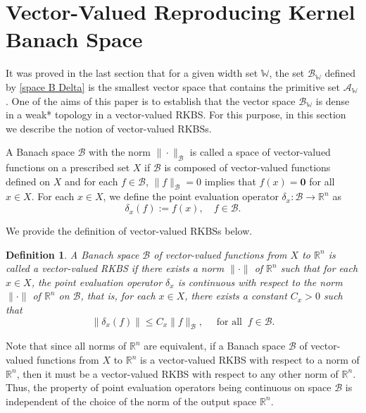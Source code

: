 \documentclass[11pt]{article}
\newtheorem{definition}[theorem]{Definition}
\begin{document}
%

%



\section{Vector-Valued Reproducing Kernel Banach Space}
It was proved in the last section that for a given width set $\mathbb{W}$, the set $\mathcal{B}_{\mathbb{W}}$ defined by \eqref{space B Delta} is the smallest vector space that contains the primitive set $\mathcal{A}_\mathbb{W}$. One of the aims of this paper is to establish that the vector space $\mathcal{B}_{\mathbb{W}}$ is dense in a weak* topology in a vector-valued RKBS. For this purpose, in this section we describe the notion of vector-valued RKBSs. 

A Banach space $\mathcal{B}$ with the norm $\|\cdot\|_{\mathcal{B}}$ is called a space of vector-valued functions on a prescribed set $X$ if $\mathcal{B}$ is composed of vector-valued functions defined on $X$ and for each $f\in\mathcal{B}$, $\|f\|_{\mathcal{B}}=0$ implies that $f({x}) = \mathbf{0}$ for all ${x}\in X$. 
For each ${x}\in X$, we define the point evaluation operator $\delta_{{x}}:\mathcal{B}\to\mathbb{R}^n$ as 
\begin{equation*}
    \delta_{{x}}(f):=f({x}), \quad f\in\mathcal{B}. 
\end{equation*}

We provide the definition of vector-valued RKBSs below.

\begin{definition}\label{def: vector-valued RKBS} 
A Banach space $\mathcal{B}$ of vector-valued functions from $X$ to $\mathbb{R}^n$ is called a vector-valued RKBS if there exists a norm $\|\cdot\|$ of $\mathbb{R}^n$ such that for each $x\in X$, the point evaluation operator $\delta_x$ is continuous with respect to the norm $\|\cdot\|$ of $\mathbb{R}^n$ on $\mathcal{B}$, that is, for each $x\in X$, there exists a constant $C_x>0$ %
such that 
\[
\|\delta_x(f)\|\leq C_x\|f\|_{\mathcal{B}}, \quad\text{ for all }\ f\in\mathcal{B}.
\]
\end{definition}

Note that since all norms of  $\mathbb{R}^n$ are equivalent, if a Banach space $\mathcal{B}$ of vector-valued functions from $X$ to $\mathbb{R}^n$ is a vector-valued RKBS with respect to a norm  of $\mathbb{R}^n$, then it must be a vector-valued RKBS with respect to any other norm  of  $\mathbb{R}^n$. Thus, the property of point evaluation operators being continuous on space $\mathcal{B}$ is independent of the choice of the norm of the output space $\mathbb{R}^n$. 
\end{document}
